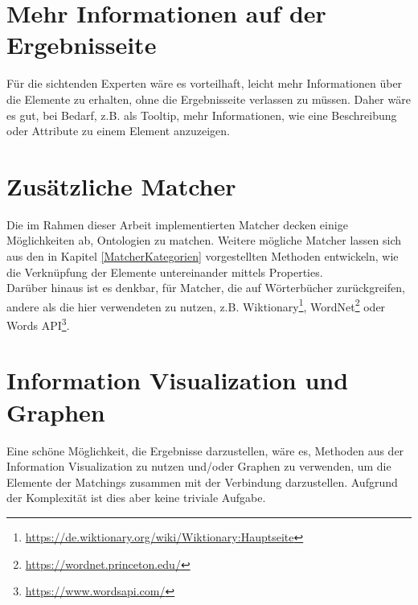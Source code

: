 \section{Mehr Informationen auf der Ergebnisseite}
Für die sichtenden Experten wäre es vorteilhaft, leicht mehr Informationen über
die Elemente zu erhalten, ohne die Ergebnisseite verlassen zu müssen. Daher wäre
es gut, bei Bedarf, z.B. als Tooltip, mehr Informationen, wie eine Beschreibung
oder Attribute zu einem Element anzuzeigen.

\section{Zusätzliche Matcher}
Die im Rahmen dieser Arbeit implementierten Matcher decken einige Möglichkeiten
ab, Ontologien zu matchen. Weitere mögliche Matcher lassen sich aus den in
Kapitel \ref{MatcherKategorien} vorgestellten Methoden entwickeln, wie die
Verknüpfung der Elemente untereinander mittels Properties.\\
Darüber hinaus ist es denkbar, für Matcher, die auf Wörterbücher zurückgreifen,
andere als die hier verwendeten zu nutzen, z.B.
Wiktionary\footnote{\url{https://de.wiktionary.org/wiki/Wiktionary:Hauptseite}},
WordNet\footnote{\url{https://wordnet.princeton.edu/}} oder Words
API\footnote{\url{https://www.wordsapi.com/}}.\\

\section{Information Visualization und Graphen}
Eine schöne Möglichkeit, die Ergebnisse darzustellen, wäre es, Methoden aus der
Information Visualization zu nutzen und/oder Graphen zu verwenden, um die
Elemente der Matchings zusammen mit der Verbindung darzustellen. Aufgrund der
Komplexität ist dies aber keine triviale Aufgabe.

\cleardoublepage
\pagebreak[4]